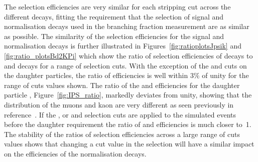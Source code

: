 The selection efficiencies are very similar for each stripping cut across the different decays, fitting the requirement that the selection of signal and normalisation decays used in the branching fraction measurement are as similar as possible. The similarity of the selection efficiencies for the signal and normalisation decays is further illustrated in Figures~\ref{fig:ratioplotsJpsik} and \ref{fig:ratio_plotsBd2KPi} which show the ratio of selection efficiencies of \bsmumu decays to \bujpsik and \bdkpi decays for a range of selection cuts. With the exception of the \bsmumu and \bujpsik \chiIP cuts on the daughter particles, the ratio of efficiencies is well within $3\%$ of unity for the range of cuts values shown. The ratio of the \bsmumu and \bujpsik efficiencies for the daughter particle \chiIP, Figure~\ref{fig:IPS_ratio}, markedly deviates from unity, showing that the \chiIP distribution of the muons and kaon are very different as seen previously in reference~\cite{Diego}. If the \chiFD, \bs or \jpsi \chiIP and \chivtx selection cuts are applied to the simulated events before the daughter \chiIP requirement the ratio of \bmumu and \bujpsik efficiencies is much closer to~1. The stability of the ratios of selection efficiencies across a large range of cuts values shows that changing a cut value in the \bmumu selection will have a similar impact on the efficiencies of the normalisation decays. 


